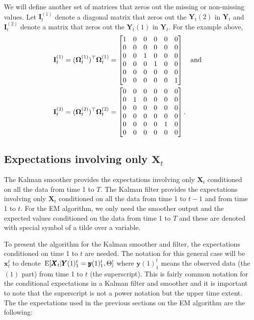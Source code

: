 \documentclass[]{article}
\def\OMG{\mbox{\boldmath $\Omega$}}
\def\E{\,\textup{\textrm{E}}}
\def\IIm{\mbox{$\mathbf I$}}
\def\XX{\mbox{$\pmb{X}$}}	\def\xx{\mbox{$\pmb{x}$}}
\def\YY{\mbox{$\pmb{Y}$}}	\def\yy{\mbox{$\pmb{y}$}}
\begin{document}
We will define another set of matrices that zeros out the missing or non-missing values. Let $\IIm_t^{(1)}$ denote a diagonal matrix that zeros out the $\YY_t(2)$ in $\YY_t$ and $\IIm_t^{(2)}$ denote a matrix that zeros out the $\YY_t(1)$ in $\YY_t$.  For the example above, 
\begin{equation}
\begin{split}
\IIm_t^{(1)} &= (\OMG_t^{(1)})^\top\OMG_t^{(1)} =
\begin{bmatrix}
1&0&0&0&0&0\\
0&0&0&0&0&0\\
0&0&1&0&0&0\\
0&0&0&1&0&0\\
0&0&0&0&0&0\\
0&0&0&0&0&1\\
\end{bmatrix}\quad\text{and}\\
\IIm_t^{(2)} &= (\OMG_t^{(2)})^\top\OMG_t^{(2)} =
\begin{bmatrix}
0&0&0&0&0&0\\
0&1&0&0&0&0\\
0&0&0&0&0&0\\
0&0&0&0&0&0\\
0&0&0&0&1&0\\
0&0&0&0&0&0\\
\end{bmatrix}.
\end{split}
\end{equation}

\subsection{Expectations involving only $\XX_t$}\label{sec:kalman.smoother}
The Kalman smoother provides the expectations involving only $\XX_t$ conditioned on all the data from time 1 to $T$. The Kalman filter provides the expectations involving only $\XX_t$ conditioned on all the data from time 1 to $t-1$ and from time 1 to $t$. For the EM algorithm, we only need the smoother output and the expected values conditioned on the data from time 1 to $T$ and these are denoted with special symbol of a tilde over a variable. 

To present the algorithm for the Kalman smoother and filter, the expectations conditioned on time 1 to $t$ are needed. The notation for this general case will be $\xx_t^t$ to denote $\E[\XX_t|\YY(1)_1^t=\yy(1)_1^t,\Theta]$ where $\yy(1)_1^t$ means the observed data (the $(1)$ part) from time 1 to $t$ (the superscript). This is fairly common notation for the conditional expectations in a Kalman filter and smoother and it is important to note that the superscript is not a power notation but the upper time extent. The the expectations used in the previous sections on the EM algorithm are the following:
 
\end{document}

